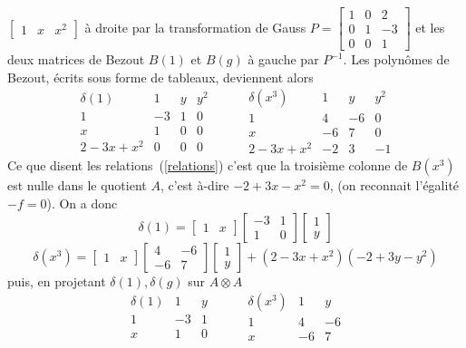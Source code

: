 \documentclass{standalone}
\begin{document}
$\begin{bmatrix}
	1 & x & x^2
\end{bmatrix}$ à droite par la transformation de Gauss
$P =
\begin{bmatrix}
	1 & 0 & 2 \\
	0 & 1 & -3 \\
	0 & 0 & 1
\end{bmatrix}$
et les deux matrices de Bezout $B(1)$ et $B(g)$ à gauche par $P^{-1}$. Les polynômes de Bezout, écrits sous forme de tableaux, deviennent alors
$$
\begin{array}{c|ccc}
	\delta(1) & 1 & y & y^2\\
	\hline
	1 & -3 & 1 & 0\\
	x & 1 & 0 & 0\\
	2 - 3x + x^2 & 0 & 0 & 0
\end{array}
\hspace{1cm}
\begin{array}{c|ccc}
	\delta(x^3) & 1 & y & y^2\\
	\hline
	1 & 4 & -6 & 0 \\
	x & -6 & 7 & 0 \\
	2 - 3x + x^2 & -2 & 3 & -1
\end{array}
$$
Ce que disent les relations~(\ref{relations}) c'est que la troisième colonne de $B(x^3)$ est nulle dans le quotient $A$, c'est à-dire $-2 + 3x - x^2 = 0$, (on reconnait l'égalité $-f = 0$). On a donc
$$
\delta(1) = \begin{bmatrix}
	1 & x
\end{bmatrix}
\begin{bmatrix}
	-3 & 1 \\
	1 & 0
\end{bmatrix}
\begin{bmatrix}
	1 \\
	y
\end{bmatrix}$$
$$\delta(x^3) = \begin{bmatrix}
	1 & x
\end{bmatrix}
\begin{bmatrix}
	4 & -6 \\
	-6 & 7
\end{bmatrix}
\begin{bmatrix}
	1 \\
	y
\end{bmatrix} + (2 - 3x + x^2)(-2 + 3y - y^2)$$
puis, en projetant $\delta(1), \delta(g)$ sur $A \otimes A$
$$
\begin{array}{c|cc}
	\delta(1) & 1 & y \\
	\hline
	1 & -3 & 1 \\
	x & 1 & 0
\end{array}
\hspace{1cm}
\begin{array}{c|cc}
	\delta(x^3) & 1 & y \\
	\hline
	1 & 4 & -6  \\
	x & -6 & 7
\end{array}
$$
\end{document}
